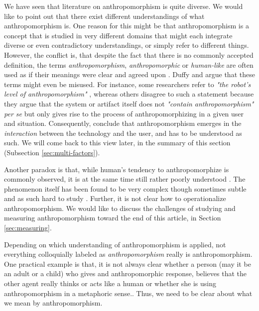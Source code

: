 \documentclass{frontiersSCNS} %
\begin{document}
We have seen that literature on anthropomorphism is quite diverse. We would like to point out that there exist different understandings of what anthropomorphism is. 
One reason for this might be that anthropomorphism
is a concept that is studied in very different domains that might each
integrate diverse or even contradictory understandings, or simply refer to different things.
However, the conflict is, that despite the fact that there is no commonly accepted definition, the terms
\textit{anthropomorphism}, \textit{anthropomorphic} or \textit{human-like} are
often used as if their meanings were clear and agreed upon
\citep{persson_anthropomorphism_2000}. Duffy \cite{duffy_anthropomorphism_2002} and \cite{epley_when_2008}
argue that these terms might even be misused. For instance, some researchers refer to \textit{"the
robot's level of anthropomorphism"} \cite{bartneck_is_2007}, whereas others
disagree to such a statement because they argue that the system or artifact itself does not \textit{"contain anthropomorphism" per se} but only gives rise to the process of anthropomorphizing in a
given user and situation. Consequently, \cite{persson_anthropomorphism_2000} conclude that
anthropomorphism emerges in the \textit{interaction} between the technology and
the user, and has to be understood as such. 
We will come back to this view later, in the summary of this section (Subsection \ref{sec:multi-factors}). 

Another paradox is that, while human's tendency to anthropomorphize is commonly observed, it is 
at the same time still rather poorly understood
\cite{epley_seeing_2007}. The phenomenon itself has been found to be very complex though sometimes
subtle and as such hard to study \cite{epley_when_2008,duffy_anthropomorphism_2002}. Further, it is not clear how to operationalize anthropomorphism. We would like to discuss the challenges of studying and measuring anthropomorphism toward the end of this article, in Section \ref{sec:measuring}.

Depending on which understanding of anthropomorphism is applied, not everything 
colloquially labeled as \emph{anthropomorphism} really is anthropomorphism.
One practical example is that, it is not always clear whether a person (may it be an adult or 
a child) who gives and anthropomorphic response, believes that the other agent really 
thinks or acts like a human or whether she is using anthropomorphism in a metaphoric 
sense.\citep{leeds_childrens_1992}.
Thus, we need to be clear about what we mean by anthropomorphism. 
\end{document}
